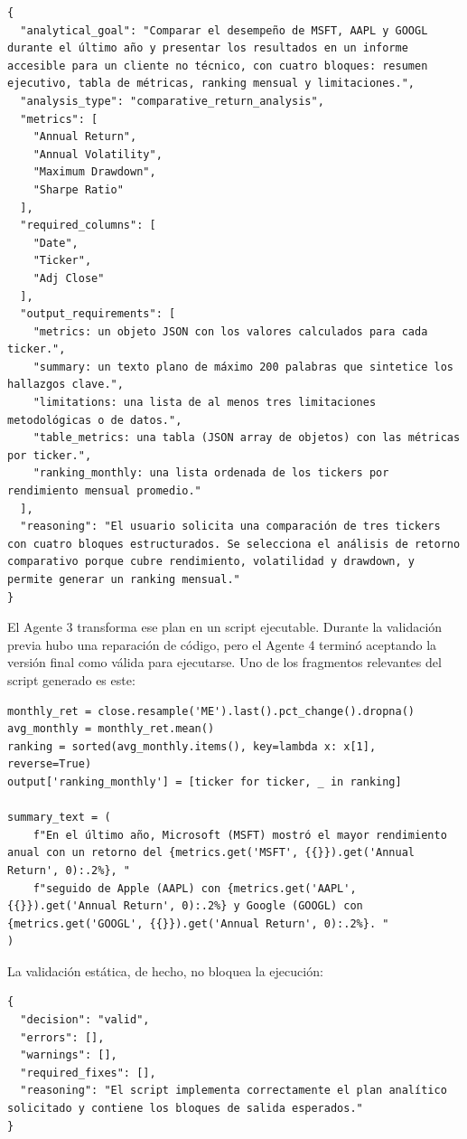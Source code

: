 \begin{lstlisting}[style=traceblock]
{
  "analytical_goal": "Comparar el desempeño de MSFT, AAPL y GOOGL durante el último año y presentar los resultados en un informe accesible para un cliente no técnico, con cuatro bloques: resumen ejecutivo, tabla de métricas, ranking mensual y limitaciones.",
  "analysis_type": "comparative_return_analysis",
  "metrics": [
    "Annual Return",
    "Annual Volatility",
    "Maximum Drawdown",
    "Sharpe Ratio"
  ],
  "required_columns": [
    "Date",
    "Ticker",
    "Adj Close"
  ],
  "output_requirements": [
    "metrics: un objeto JSON con los valores calculados para cada ticker.",
    "summary: un texto plano de máximo 200 palabras que sintetice los hallazgos clave.",
    "limitations: una lista de al menos tres limitaciones metodológicas o de datos.",
    "table_metrics: una tabla (JSON array de objetos) con las métricas por ticker.",
    "ranking_monthly: una lista ordenada de los tickers por rendimiento mensual promedio."
  ],
  "reasoning": "El usuario solicita una comparación de tres tickers con cuatro bloques estructurados. Se selecciona el análisis de retorno comparativo porque cubre rendimiento, volatilidad y drawdown, y permite generar un ranking mensual."
}
\end{lstlisting}

El Agente 3 transforma ese plan en un script ejecutable. Durante la validaci\'on previa hubo una reparaci\'on de c\'odigo, pero el Agente 4 termin\'o aceptando
la versi\'on final como v\'alida para ejecutarse. Uno de los fragmentos relevantes del script generado es este:

\begin{lstlisting}[style=traceblock]
monthly_ret = close.resample('ME').last().pct_change().dropna()
avg_monthly = monthly_ret.mean()
ranking = sorted(avg_monthly.items(), key=lambda x: x[1], reverse=True)
output['ranking_monthly'] = [ticker for ticker, _ in ranking]

summary_text = (
    f"En el último año, Microsoft (MSFT) mostró el mayor rendimiento anual con un retorno del {metrics.get('MSFT', {{}}).get('Annual Return', 0):.2%}, "
    f"seguido de Apple (AAPL) con {metrics.get('AAPL', {{}}).get('Annual Return', 0):.2%} y Google (GOOGL) con {metrics.get('GOOGL', {{}}).get('Annual Return', 0):.2%}. "
)
\end{lstlisting}

La validaci\'on est\'atica, de hecho, no bloquea la ejecuci\'on:

\begin{lstlisting}[style=traceblock]
{
  "decision": "valid",
  "errors": [],
  "warnings": [],
  "required_fixes": [],
  "reasoning": "El script implementa correctamente el plan analítico solicitado y contiene los bloques de salida esperados."
}
\end{lstlisting}


